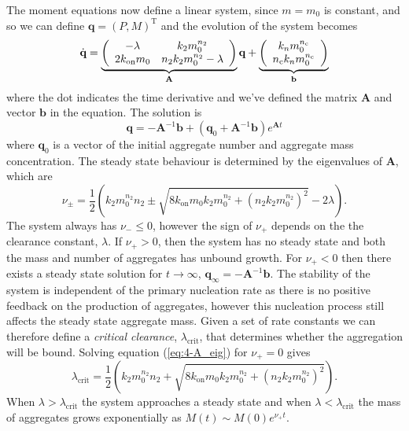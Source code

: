 The moment equations now define a linear system, since $m=m_0$ is constant, and so we can define $\textbf{q}=(P, M)^\text{T}$ and the evolution of the system becomes
\begin{equation}
    \dot{\textbf{q}} =
    \underbrace{\left(
    \begin{array}{cc}
    -\lambda & k_2 m_0^{n_2} \\
    2 k_\text{on}m_0 & n_2 k_2 m_0^{n_2}-\lambda  \\
    \end{array}
    \right)}
    _{\textbf{A}}
    \textbf{q}
    +
    \underbrace{\left(
    \begin{array}{c}
    k_n m_0^{n_{\mathrm{c}}} \\
    n_{\mathrm{c}} k_n m_0^{n_{\mathrm{c}}} \\
    \end{array}
    \right)}
    _{\textbf{b}}
    \label{eq:4-momentEvomatform}
\end{equation}
where the dot indicates the time derivative and we've defined the matrix $\textbf{A}$ and vector ${\textbf{b}}$ in the equation. The solution is 
\begin{equation}
    \textbf{q} = -\textbf{A}^{-1}\textbf{b}+\left(\textbf{q}_0+\textbf{A}^{-1}\textbf{b}\right)e^{\textbf{A}t}
    \label{eq:4-momentSolvematform}
\end{equation}
where $\textbf{q}_0$ is a vector of the initial aggregate number and aggregate mass concentration. The steady state behaviour is determined by the eigenvalues of $\textbf{A}$, which are
\begin{equation}
    \nu_{\pm} = \frac{1}{2} \left(k_2 m_0^{n_2} n_2 \pm \sqrt{8 k_\text{on} m_0 k_2 m_0^{n_2} + \left(n_2 k_2 m_0^{n_2}\right)^2} - 2 \lambda \right).
    \label{eq:4-A_eig}
\end{equation}
The system always has $\nu_{-} \leq 0$, however the sign of $\nu_+$ depends on the the clearance constant, $\lambda$. If $\nu_+>0$, then the system has no steady state and both the mass and number of aggregates has unbound growth. For $\nu_+<0$ then there exists a steady state solution for $t\rightarrow\infty$, $\textbf{q}_\infty = -\textbf{A}^{-1}\textbf{b}$. The stability of the system is independent of the primary nucleation rate as there is no positive feedback on the production of aggregates, however this nucleation process still affects the steady state aggregate mass. Given a set of rate constants we can therefore define a \textit{critical clearance}, $\lambda_{\text{crit}}$, that determines whether the aggregation will be bound. Solving equation (\ref{eq:4-A_eig}) for $\nu_+=0$ gives
\begin{equation}
    \lambda_{\text{crit}} = \frac{1}{2} \left(k_2 m_0^{n_2} n_2 + \sqrt{8 k_\text{on} m_0 k_2 m_0^{n_2} + \left(n_2 k_2 m_0^{n_2}\right)^2}\right).
    \label{eq:2-critclear}
\end{equation}
 When $\lambda>\lambda_{\text{crit}}$ the system approaches a steady state and when $\lambda<\lambda_{\text{crit}}$ the mass of aggregates grows exponentially as $M(t)\sim M(0)e^{\nu_+ t}$.

